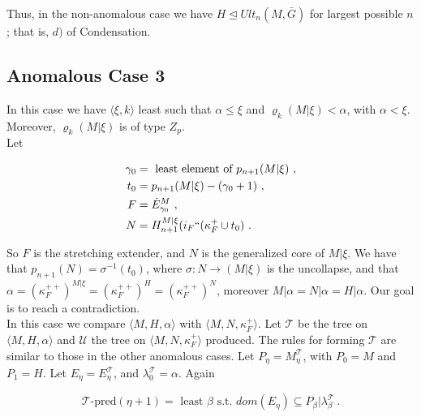 \documentclass[12pt]{article}
\begin{document}
Thus, in the non-anomalous case we have $H \unlhd Ult_n(M, \bar{G})$ for largest possible $n$; that is, $d)$ of Condensation.\\





\subsection{Anomalous Case 3}








In this case we have $\langle \xi , k \rangle$ least such that $\alpha \leq \xi$ and $\varrho_k (M | \xi ) < \alpha$, with $\alpha < \xi$.  Moreover, $\varrho_k (M | \xi)$ is of type $Z_p$.\\


Let

\[
\begin{split}
\gamma_0 & = \text{ least element of } p_{n+1} (M | \xi ) \ , \\
t_0 & = p_{n+1} (M | \xi ) - (\gamma_0 + 1) \ , \\
F & = \dot{E}_{\gamma_0}^{M} \ , \\
N & = H_{n+1}^{M | \xi } (i_F `` (\kappa_F^+ \cup t_0) \ .
\end{split}
\]

So $F$ is the stretching extender, and $N$ is the generalized core of $M | \xi$.  We have that $p_{n+1} (N) = \sigma^{-1} (t_0)$, where $\sigma: N \longrightarrow (M | \xi)$ is the uncollapse, and that $\alpha = (\kappa_F^{++})^{M | \xi} = (\kappa_F^{++})^H = (\kappa_F^{++})^N$, moreover $M | \alpha = N | \alpha = H | \alpha$.  Our goal is to reach a contradiction.\\

In this case we compare $\langle M , H, \alpha \rangle $ with $\langle M , N, \kappa_F^+ \rangle$.  Let $\mathscr{T}$ be the tree on $\langle M , H, \alpha \rangle $ and $\mathscr{U}$ the tree on $\langle M , N, \kappa_F^+ \rangle $ produced.  The rules for forming $\mathscr{T}$ are similar to those in the other anomalous cases.  Let $P_\eta = M_\eta^{\mathscr{T}}$, with $P_0 = M$ and $P_1 = H$.  Let $E_\eta = E_\eta^{\mathscr{T}}$, and $\lambda_0^{\mathscr{T}} = \alpha$.  Again

\[
\mathscr{T}\text{-pred} (\eta + 1) = \text{ least } \beta \text{ s.t. } dom (E_\eta) \subseteq P_\beta | \lambda_\beta^{\mathscr{T}} \ .
\]
\end{document}

